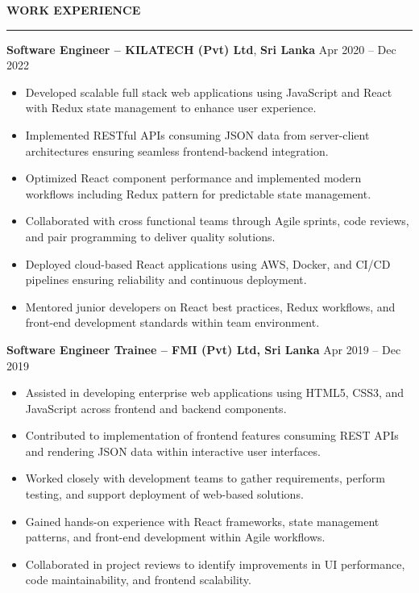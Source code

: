 \documentclass[10pt,letterpaper]{article}
\begin{document}
\textbf{WORK EXPERIENCE}\\[-8pt]
\noindent\rule{\textwidth}{1pt}

\vspace{-2pt}

\textbf{Software Engineer -- KILATECH (Pvt) Ltd}, \textbf{Sri Lanka} \hfill Apr 2020 -- Dec 2022

\vspace{-1pt}

\begin{itemize}
\item Developed scalable full stack web applications using JavaScript and React with Redux state management to enhance user experience.
\item Implemented RESTful APIs consuming JSON data from server-client architectures ensuring seamless frontend-backend integration.
\item Optimized React component performance and implemented modern workflows including Redux pattern for predictable state management.
\item Collaborated with cross functional teams through Agile sprints, code reviews, and pair programming to deliver quality solutions.
\item Deployed cloud-based React applications using AWS, Docker, and CI/CD pipelines ensuring reliability and continuous deployment.
\item Mentored junior developers on React best practices, Redux workflows, and front-end development standards within team environment.
\end{itemize}

\textbf{Software Engineer Trainee -- FMI (Pvt) Ltd, Sri Lanka} \hfill Apr 2019 -- Dec 2019

\vspace{-1pt}

\begin{itemize}
\item Assisted in developing enterprise web applications using HTML5, CSS3, and JavaScript across frontend and backend components.
\item Contributed to implementation of frontend features consuming REST APIs and rendering JSON data within interactive user interfaces.
\item Worked closely with development teams to gather requirements, perform testing, and support deployment of web-based solutions.
\item Gained hands-on experience with React frameworks, state management patterns, and front-end development within Agile workflows.
\item Collaborated in project reviews to identify improvements in UI performance, code maintainability, and frontend scalability.
\end{itemize}
\end{document}
